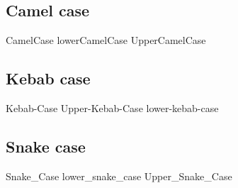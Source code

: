 
\subsection{Camel case}

CamelCase
lowerCamelCase
UpperCamelCase

\subsection{Kebab case}

Kebab-Case
Upper-Kebab-Case
lower-kebab-case

\subsection{Snake case}

Snake\_Case
lower\_snake\_case
Upper\_Snake\_Case


